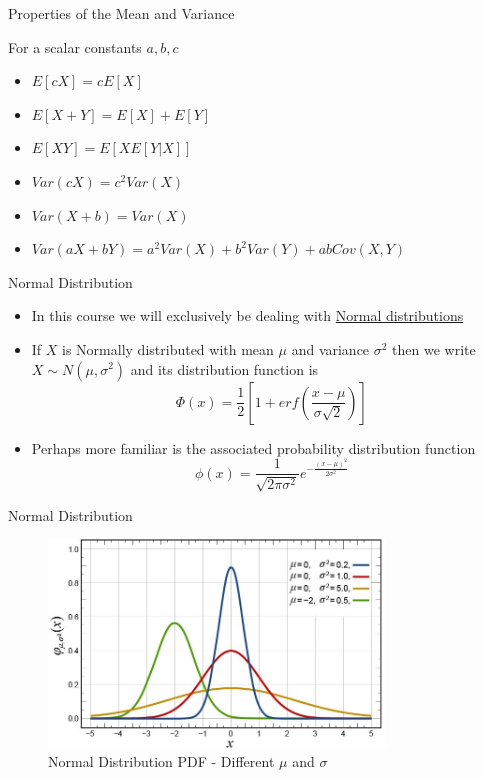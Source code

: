 

\begin{frame}{Properties of the Mean and Variance}

For a scalar constants $a,b,c$
\begin{itemize}
\item	$E[cX] = cE[X]$
\item	$E[X + Y] = E[X] + E[Y]$
\item	$E[XY] = E[X E[Y|X]]$
\item	$Var(cX) = c^{2}Var(X)$
\item	$Var(X + b) = Var(X)$
\item	$Var(aX + bY) = a^{2}Var(X) + b^{2}Var(Y) + abCov(X,Y)$
\end{itemize}

\end{frame}



\begin{frame}{Normal Distribution}

\begin{itemize}
\item	In this course we will exclusively be dealing with \href{https://en.wikipedia.org/wiki/Normal_distribution}{Normal distributions}
\item	If $X$ is Normally distributed with mean $\mu$ and variance $\sigma^{2}$ then we write $X \sim N(\mu,\sigma^{2})$ and its distribution function is
\[
\Phi(x) = \frac{1}{2} \left[ 1 + erf\left( \frac{x-\mu}{\sigma \sqrt{2}} \right) \right]
\]
\item	Perhaps more familiar is the associated probability distribution function
\[
\phi(x) = \frac{1}{\sqrt{2 \pi \sigma^{2}}}e^{- \frac{(x-\mu)^{2}}{2 \sigma^{2}}}
\]
\end{itemize}

\end{frame}



\begin{frame}{Normal Distribution}

\begin{figure}
\caption[Normal PDF]{Normal Distribution PDF - Different $\mu$ and $\sigma$}
\centering
\label{fig:Normal_Distribution_PDF}
\includegraphics[width=0.8\textwidth]{Figures/Normal_Distribution_PDF.JPG}
\end{figure}

\end{frame}